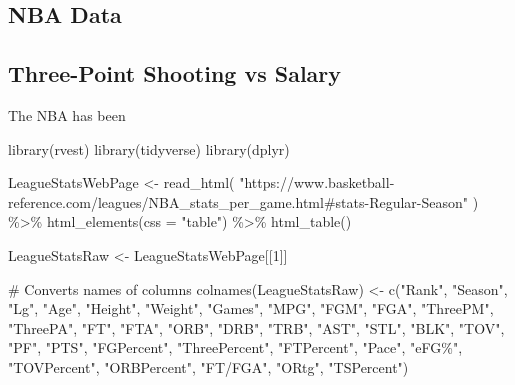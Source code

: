 \documentclass[
  letterpaper,
  DIV=11,
  numbers=noendperiod]{scrartcl}
\newenvironment{Shaded}{\begin{snugshade}}{\end{snugshade}}
\newcommand{\AttributeTok}[1]{\textcolor[rgb]{0.40,0.45,0.13}{#1}}
\newcommand{\CommentTok}[1]{\textcolor[rgb]{0.37,0.37,0.37}{#1}}
\newcommand{\DecValTok}[1]{\textcolor[rgb]{0.68,0.00,0.00}{#1}}
\newcommand{\FunctionTok}[1]{\textcolor[rgb]{0.28,0.35,0.67}{#1}}
\newcommand{\NormalTok}[1]{\textcolor[rgb]{0.00,0.23,0.31}{#1}}
\newcommand{\OtherTok}[1]{\textcolor[rgb]{0.00,0.23,0.31}{#1}}
\newcommand{\SpecialCharTok}[1]{\textcolor[rgb]{0.37,0.37,0.37}{#1}}
\newcommand{\StringTok}[1]{\textcolor[rgb]{0.13,0.47,0.30}{#1}}
\begin{document}
\subsection{NBA Data}\label{nba-data}

\subsection{Three-Point Shooting vs
Salary}\label{three-point-shooting-vs-salary}

The NBA has been

\begin{Shaded}
\begin{Highlighting}[]
\FunctionTok{library}\NormalTok{(rvest)}
\FunctionTok{library}\NormalTok{(tidyverse)}
\FunctionTok{library}\NormalTok{(dplyr)}

\NormalTok{LeagueStatsWebPage }\OtherTok{\textless{}{-}} \FunctionTok{read\_html}\NormalTok{(}
  \StringTok{"https://www.basketball{-}reference.com/leagues/NBA\_stats\_per\_game.html\#stats{-}Regular{-}Season"}
\NormalTok{) }\SpecialCharTok{\%\textgreater{}\%} \FunctionTok{html\_elements}\NormalTok{(}\AttributeTok{css =} \StringTok{"table"}\NormalTok{) }\SpecialCharTok{\%\textgreater{}\%}
  \FunctionTok{html\_table}\NormalTok{()}

\NormalTok{LeagueStatsRaw }\OtherTok{\textless{}{-}}\NormalTok{ LeagueStatsWebPage[[}\DecValTok{1}\NormalTok{]]}

\CommentTok{\# Converts names of columns}
\FunctionTok{colnames}\NormalTok{(LeagueStatsRaw) }\OtherTok{\textless{}{-}} \FunctionTok{c}\NormalTok{(}\StringTok{"Rank"}\NormalTok{, }\StringTok{"Season"}\NormalTok{, }\StringTok{"Lg"}\NormalTok{, }\StringTok{"Age"}\NormalTok{, }\StringTok{"Height"}\NormalTok{, }\StringTok{"Weight"}\NormalTok{, }\StringTok{"Games"}\NormalTok{, }\StringTok{"MPG"}\NormalTok{, }\StringTok{"FGM"}\NormalTok{, }\StringTok{"FGA"}\NormalTok{, }\StringTok{"ThreePM"}\NormalTok{, }\StringTok{"ThreePA"}\NormalTok{, }\StringTok{"FT"}\NormalTok{, }\StringTok{"FTA"}\NormalTok{, }\StringTok{"ORB"}\NormalTok{, }\StringTok{"DRB"}\NormalTok{, }\StringTok{"TRB"}\NormalTok{, }\StringTok{"AST"}\NormalTok{, }\StringTok{"STL"}\NormalTok{, }\StringTok{"BLK"}\NormalTok{, }\StringTok{"TOV"}\NormalTok{, }\StringTok{"PF"}\NormalTok{, }\StringTok{"PTS"}\NormalTok{, }\StringTok{"FGPercent"}\NormalTok{, }\StringTok{"ThreePercent"}\NormalTok{, }\StringTok{"FTPercent"}\NormalTok{, }\StringTok{"Pace"}\NormalTok{, }\StringTok{"eFG\%"}\NormalTok{, }\StringTok{"TOVPercent"}\NormalTok{, }\StringTok{"ORBPercent"}\NormalTok{, }\StringTok{"FT/FGA"}\NormalTok{, }\StringTok{"ORtg"}\NormalTok{, }\StringTok{"TSPercent"}\NormalTok{)}


\end{Highlighting}
\end{Shaded}
\end{document}
